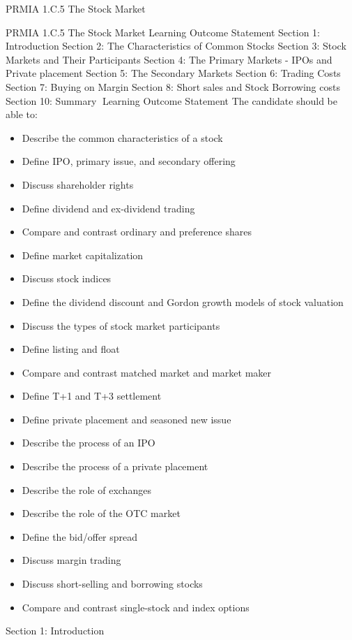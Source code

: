 PRMIA 1.C.5 The Stock Market

PRMIA 1.C.5 The Stock Market
Learning Outcome Statement
Section 1: Introduction
Section 2: The Characteristics of Common Stocks
Section 3: Stock Markets and Their Participants
Section 4: The Primary Markets - IPOs and Private placement
Section 5: The Secondary Markets
Section 6: Trading Costs
Section 7: Buying on Margin
Section 8: Short sales and Stock Borrowing costs
Section 10: Summary
Learning Outcome Statement
The candidate should be able to:
  \begin{itemize}	
\item	Describe the common characteristics of a stock
\item	  Define IPO, primary issue, and secondary offering
\item	  Discuss shareholder rights
\item	  Define dividend and ex-dividend trading
\item	  Compare and contrast ordinary and preference shares
\item	  Define market capitalization
\item	  Discuss stock indices
\item	  Define the dividend discount and Gordon growth models of stock valuation
\item	  Discuss the types of stock market participants
\item	  Define listing and float
\item	  Compare and contrast matched market and market maker
\item	  Define T+1 and T+3 settlement
\item	  Define private placement and seasoned new issue
\item	  Describe the process of an IPO
\item	  Describe the process of a private placement
\item	  Describe the role of exchanges
\item	  Describe the role of the OTC market
\item	  Define the bid/offer spread
\item	  Discuss margin trading
\item	  Discuss short-selling and borrowing stocks
\item	  Compare and contrast single-stock and index options
\end{itemize}	


Section 1: Introduction
